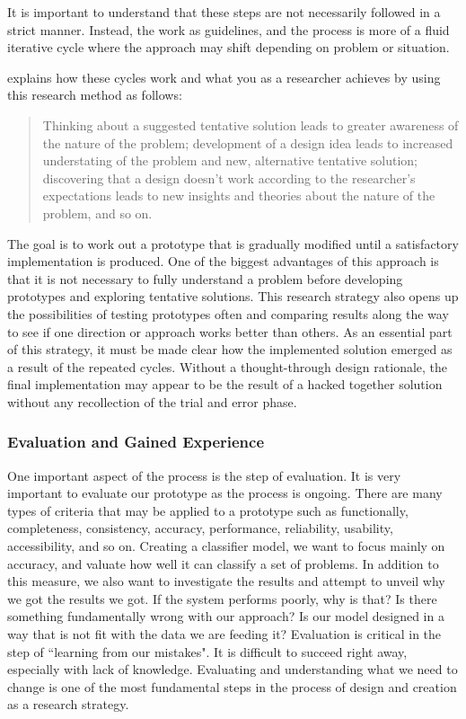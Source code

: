 It is important to understand that these steps are not necessarily followed in a strict manner. Instead, the work as guidelines, and the process is more of a fluid iterative cycle where the approach may shift depending on problem or situation.

\cite{reseach-boka} explains how these cycles work and what you as a researcher achieves by using this research method as follows:

\begin{quote}
    Thinking about a suggested tentative solution leads to greater awareness of the nature of the problem; development of a design idea leads to increased understating of the problem and new, alternative tentative solution; discovering that a design doesn't work according to the researcher's expectations leads to new insights and theories about the nature of the problem, and so on. 
\end{quote}

The goal is to work out a prototype that is gradually modified until a satisfactory implementation is produced. One of the biggest advantages of this approach is that it is not necessary to fully understand a problem before developing prototypes and exploring tentative solutions. This research strategy also opens up the possibilities of testing prototypes often and comparing results along the way to see if one direction or approach works better than others. As an essential part of this strategy, it must be made clear how the implemented solution emerged as a result of the repeated cycles. Without a thought-through design rationale, the final implementation may appear to be the result of a hacked together solution without any recollection of the trial and error phase.

\subsubsection{Evaluation and Gained Experience}
One important aspect of the process is the step of evaluation. It is very important to evaluate our prototype as the process is ongoing. There are many types of criteria that may be applied to a prototype such as functionally, completeness, consistency, accuracy, performance, reliability, usability, accessibility, and so on. Creating a classifier model, we want to focus mainly on accuracy, and valuate how well it can classify a set of problems. In addition to this measure, we also want to investigate the results and attempt to unveil why we got the results we got. If the system performs poorly, why is that? Is there something fundamentally wrong with our approach? Is our model designed in a way that is not fit with the data we are feeding it? Evaluation is critical in the step of ``learning from our mistakes". It is difficult to succeed right away, especially with lack of knowledge. Evaluating and understanding what we need to change is one of the most fundamental steps in the process of design and creation as a research strategy.

